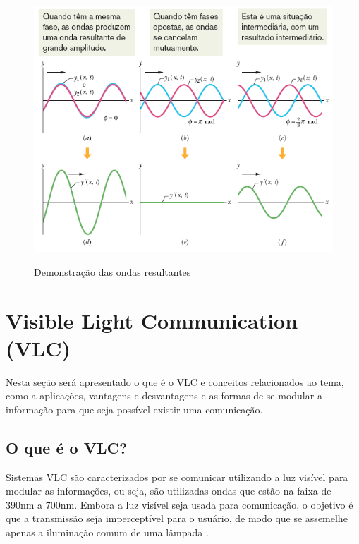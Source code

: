 \begin{figure}[!htbp]
  \caption{Demonstração das ondas resultantes}
  \includegraphics[scale=0.5]{images/ondas_interferencia.png}
  \label{fig:ondas_inter}
\end{figure}


\section{Visible Light Communication (VLC)}

Nesta seção será apresentado o que é o VLC e conceitos relacionados ao tema, como a aplicações, vantagens e desvantagens e as formas de se modular a informação para que seja possível existir uma comunicação.

\subsection{O que é o VLC?}

Sistemas VLC são caracterizados por se comunicar utilizando a luz visível para modular as informações, ou seja, são utilizadas ondas que estão na faixa de 390nm a 700nm. Embora a luz visível seja usada para comunicação, o objetivo é que a transmissão seja imperceptível para o usuário, de modo que se assemelhe apenas a iluminação comum de uma lâmpada \cite{matheus2017comunicaccao}.

